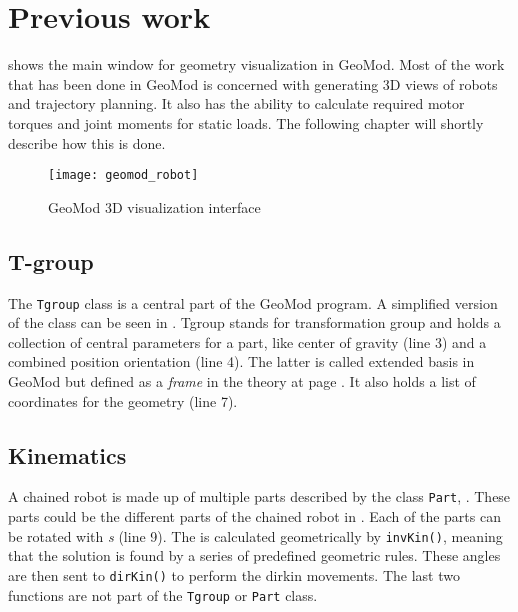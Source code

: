 \chapter{Previous work}\label{previous_work}

 shows the main window for geometry visualization in GeoMod. Most of the work that has been done in GeoMod is concerned with generating 3D views of robots and trajectory planning. It also has the ability to calculate required motor torques and joint moments for static loads. The following chapter will shortly describe how this is done. 

\begin{figure}
 \centering 
 \texttt{[image: geomod\_robot]}
 \caption{GeoMod 3D visualization interface}
 \label{geomod_interface}
\end{figure}

\section{T-group}


The \texttt{Tgroup} class is a central part of the GeoMod program. A simplified version of the class can be seen in . Tgroup stands for transformation group and holds a collection of central parameters for a part, like center of gravity (line 3) and a combined position orientation (line 4). The latter is called extended basis in GeoMod but defined as a \textit{frame} in the theory at page \pageref{secTheory}. It also holds a list of coordinates for the geometry (line 7).

\label{Tgroup}


\vspace{-0.5cm}

\section{Kinematics}

A chained robot is made up of multiple parts described by the class \texttt{Part}, . These parts could be the different parts of the chained robot in . Each of the parts can be rotated with \textit{s} (line 9). The  is calculated geometrically by \texttt{invKin()}, meaning that the solution is found by a series of predefined geometric rules. These angles are then sent to \texttt{dirKin()} to perform the \gls{dirkin} movements. The last two functions are not part of the \texttt{Tgroup} or \texttt{Part} class.

